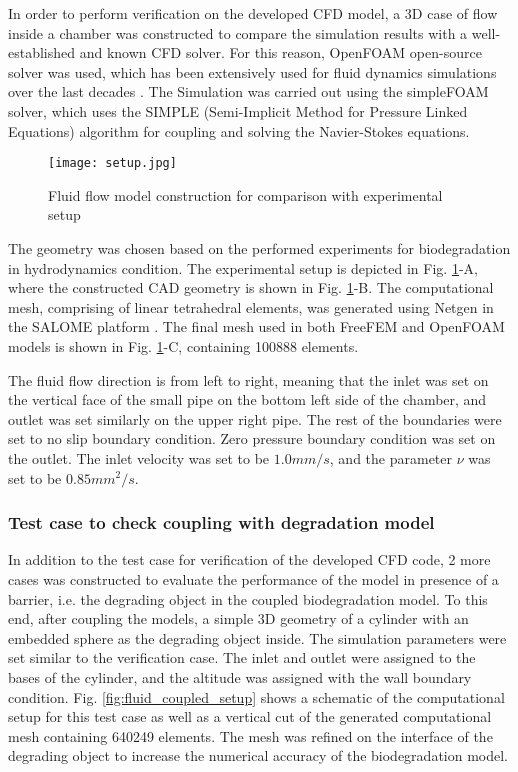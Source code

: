 In order to perform verification on the developed CFD model, a 3D case of flow inside a chamber was constructed to compare the simulation results with a well-established and known CFD solver. For this reason, OpenFOAM open-source solver was used, which has been extensively used for fluid dynamics simulations over the last decades \cite{Weller1998}. The Simulation was carried out using the simpleFOAM solver, which uses the SIMPLE (Semi-Implicit Method for Pressure Linked Equations) algorithm for coupling and solving the Navier-Stokes equations.

\begin{figure}[h]
\centering
\medskip
\texttt{[image: setup.jpg]}
\caption[Fluid flow model construction for comparison with experimental setup]{Fluid flow model construction for comparison with experimental setup} \label{fig:fluid_setup}
\end{figure}

The geometry was chosen based on the performed experiments for biodegradation in hydrodynamics condition. The experimental setup is depicted in Fig. \ref{fig:fluid_setup}-A, where the constructed CAD geometry is shown in Fig. \ref{fig:fluid_setup}-B. The computational mesh, comprising of linear tetrahedral elements, was generated using Netgen \cite{Schoeberl1997} in the SALOME platform \cite{Ribes2007}. The final mesh used in both FreeFEM and OpenFOAM models is shown in Fig. \ref{fig:fluid_setup}-C, containing \num{100888} elements.

The fluid flow direction is from left to right, meaning that the inlet was set on the vertical face of the small pipe on the bottom left side of the chamber, and outlet was set similarly on the upper right pipe. The rest of the boundaries were set to no slip boundary condition. Zero pressure boundary condition was set on the outlet. The inlet velocity was set to be $1.0 mm/s$, and the parameter $\nu$ was set to be $0.85 mm^2/s$. 

\subsubsection{Test case to check coupling with degradation model}

In addition to the test case for verification of the developed CFD code, 2 more cases was constructed to evaluate the performance of the model in presence of a barrier, i.e. the degrading object in the coupled biodegradation model. To this end, after coupling the models, a simple 3D geometry of a cylinder with an embedded sphere as the degrading object inside. The simulation parameters were set similar to the verification case. The inlet and outlet were assigned to the bases of the cylinder, and the altitude was assigned with the wall boundary condition. Fig. \ref{fig:fluid_coupled_setup} shows a schematic of the computational setup for this test case as well as a vertical cut of the generated computational mesh containing \num{640249} elements. The mesh was refined on the interface of the degrading object to increase the numerical accuracy of the biodegradation model.


